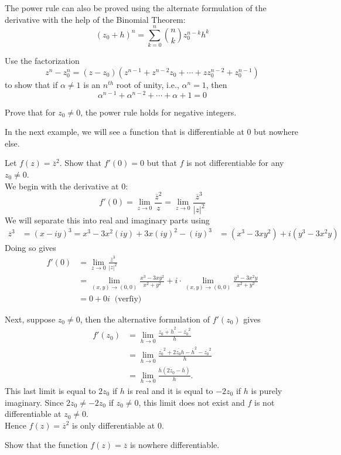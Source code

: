 \documentclass[handout]{ximera}
\begin{document}
\begin{remark}
The power rule can also be proved using the alternate formulation of the derivative with the help of the Binomial Theorem:
\[
(z_0 + h)^n = \sum_{k = 0}^n \binom{n}{k} z_0^{n-k} h^k
\]
\end{remark}


\begin{problem}
Use the factorization 
\[
z^n - z_0^n = (z-z_0)\left(z^{n-1} + z^{n-2}z_0 + \cdots + zz_0^{n-2} + z_0^{n-1} \right)
\]
to show that if $\alpha \neq 1$ is an $n^{th}$ root of unity, i.e., $\alpha^n = 1$, then
\[
\alpha^{n-1} + \alpha^{n-2} + \cdots + \alpha + 1 = 0
\]
\end{problem}

\begin{problem}
Prove that for $z_0 \neq 0$, the power rule holds for negative integers.
\end{problem}

In the next example, we will see a function that is differentiable at $0$ but nowhere else.

\begin{example}
Let $f(z) = \overline{z}^2$.  Show that $f'(0) = 0$ but that $f$ is not differentiable for any $z_0 \neq 0$.\\
We begin with the derivative at $0$:
\[
f'(0) = \lim_{z \to  0} \frac{\overline{z}^2}{z} = \lim_{z \to  0} \frac{\overline{z}^3}{|z|^2}
\]
We will separate this into real and imaginary parts using 
\begin{align*}
\overline{z}^3 &= (x -iy)^3 = x^3 - 3x^2(iy) + 3x(iy)^2  - (iy)^3 
              &= (x^3 -3xy^2) + i(y^3 - 3x^2y)
\end{align*}
Doing so gives
\begin{align*}
f'(0) &= \lim_{z \to  0} \frac{\overline{z}^3}{|z|^2}\\
      &= \lim_{(x,y) \to (0,0)} \frac{x^3 -3xy^2}{x^2 +y^2} + i\cdot \lim_{(x,y) \to (0,0)} \frac{y^3 - 3x^2y}{x^2 +y^2}\\
      & = 0 + 0i \;\; \mbox{(verfiy)}
\end{align*}

Next, suppose $z_0 \neq 0$, then the alternative formulation of $f'(z_0)$ gives
\begin{align*}
f'(z_0) &= \lim_{h \to 0} \frac{\overline{z_0 + h}^2-\overline{z_0}^2 }{h}\\[6pt]
        &=\lim_{h \to 0} \frac{\overline{z_0}^2 +\overline{2z_0h}- \overline{h}^2 -\overline{z_0}^2 }{h}\\[6pt]
        &=\lim_{h \to 0} \frac{\overline{h} \left(\overline{2z_0}- \overline{h}\right)}{h}.
\end{align*}
This last limit is equal to $2z_0$ if $h$ is real and it is equal to $-2z_0$ if $h$ is purely imaginary.
Since $2z_0 \neq -2z_0$ if $z_0 \neq 0$, this limit does not exist and $f$ is not differentiable at $z_0 \neq 0$.\\
Hence $f(z) = \overline{z}^2$ is only differentiable at $0$.

\end{example}


\begin{problem}
Show that the function $f(z) = \overline{z}$ is nowhere differentiable.
\end{problem}
\end{document}

